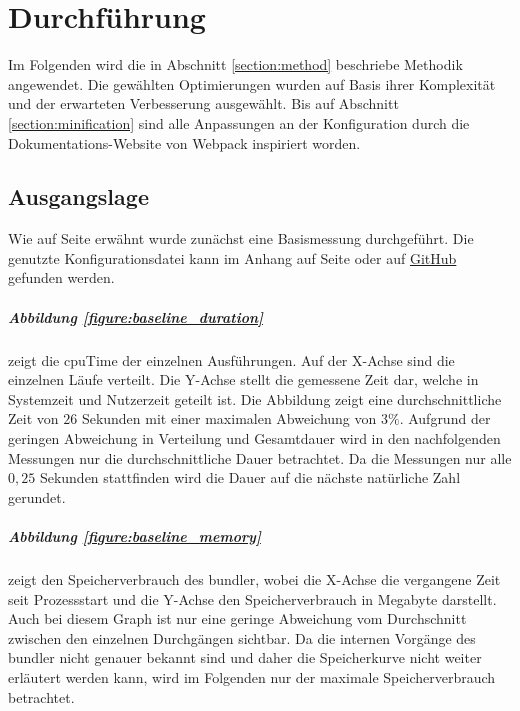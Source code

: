 \documentclass[11pt]{report}
\begin{document}
	\clearpage

	\chapter{Durchführung}
		Im Folgenden wird die in Abschnitt \ref{section:method} beschriebe Methodik angewendet. Die gewählten Optimierungen wurden auf Basis ihrer Komplexität und der erwarteten Verbesserung ausgewählt. Bis auf Abschnitt \ref{section:minification} sind alle Anpassungen an der Konfiguration durch die Dokumentations-Website von Webpack inspiriert worden\cite{optimization-source:webpack}.
	
		\section{Ausgangslage}
			Wie auf Seite \pageref{baseline-build} erwähnt wurde zunächst eine Basismessung durchgeführt. Die genutzte Konfigurationsdatei kann im Anhang auf Seite \pageref{figure:baselineConfiguration} oder auf \href{https://github.com/TexNAK/WebBundlerOptimization/blob/d018b3e0db6a861c4f41e38e7265ca8f9d500319/webpack-project/webpack.config.js}{GitHub} gefunden werden.			\paragraph{Abbildung \ref{figure:baseline_duration}} zeigt die \Gls{cpuTime} der einzelnen Ausführungen. Auf der X-Achse sind die einzelnen Läufe verteilt. Die Y-Achse stellt die gemessene Zeit dar, welche in Systemzeit und Nutzerzeit geteilt ist. Die Abbildung zeigt eine durchschnittliche Zeit von $26$ Sekunden mit einer maximalen Abweichung von $3\%$. Aufgrund der geringen Abweichung in Verteilung und Gesamtdauer wird in den nachfolgenden Messungen nur die durchschnittliche Dauer betrachtet. Da die Messungen nur alle $0,25$ Sekunden stattfinden wird die Dauer auf die nächste natürliche Zahl gerundet.
			\paragraph{Abbildung \ref{figure:baseline_memory}} zeigt den Speicherverbrauch des \Gls{bundler}, wobei die X-Achse die vergangene Zeit seit Prozessstart und die Y-Achse den Speicherverbrauch in Megabyte darstellt. Auch bei diesem Graph ist nur eine geringe Abweichung vom Durchschnitt zwischen den einzelnen Durchgängen sichtbar. Da die internen Vorgänge des \Gls{bundler} nicht genauer bekannt sind und daher die Speicherkurve nicht weiter erläutert werden kann, wird im Folgenden nur der maximale Speicherverbrauch betrachtet.
\end{document}
